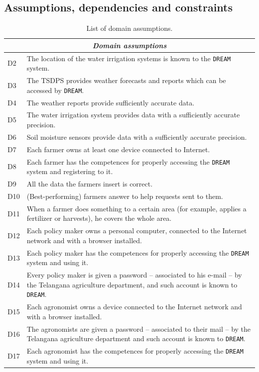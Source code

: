 \documentclass{article}
\begin{document}
\subsection{Assumptions, dependencies and constraints}

\begin{longtable}[c]{|m{0.75cm}|m{11cm}|}
 \caption{List of domain assumptions.}
 \label{Domain assumptions}
 \hline
 \multicolumn{2}{|c|}{\cellcolor{white}\textbf{\emph{Domain assumptions}}}
 \endfirsthead
 \endhead
 \endfoot
 \endlastfoot
  \hline
  D1 & The location of the sensors is known to the \verb|DREAM| system.\\
  \hline
   D2 & The location of the water irrigation systems is known to the \verb|DREAM| system.\\
  \hline
  D3 & The TSDPS provides weather forecasts and reports which can be accessed by \verb|DREAM|.\\
  \hline
  D4 & The weather reports provide sufficiently accurate data.\\
  \hline
  D5 & The water irrigation system provides data with a sufficiently accurate precision.\\
  \hline
  D6 & Soil moisture sensors provide data with a sufficiently accurate precision.\\
  \hline
  D7 & Each farmer owns at least one device connected to Internet.\\
  \hline
  D8 & Each farmer has the competences for properly accessing the \verb|DREAM| system and registering to it.\\
  \hline
  D9 & All the data the farmers insert is correct.\\
  \hline
  D10 & (Best-performing) farmers answer to help requests sent to them.\\
  \hline
  D11 & When a farmer does something to a certain area (for example, applies a fertilizer or harvests), he covers the whole area.\\
  \hline
  D12 & Each policy maker owns a personal computer, connected to the Internet network and with a browser installed.\\
 \hline
  D13 & Each policy maker has the competences for properly accessing the \verb|DREAM| system and using it.\\
  \hline
  D14 & Every policy maker is given a password – associated to his e-mail – by the Telangana agriculture department, and such account is known to \verb|DREAM|.\\
  \hline
  D15 & Each agronomist owns a device connected to the Internet network and with a browser installed.\\
  \hline
  D16 & The agronomists are given a password – associated to their mail – by the Telangana agriculture department and such account is known to \verb|DREAM|.\\
  \hline
  D17 & Each agronomist has the competences for properly accessing the \verb|DREAM| system and using it.\\
  

\end{longtable}
\end{document}
